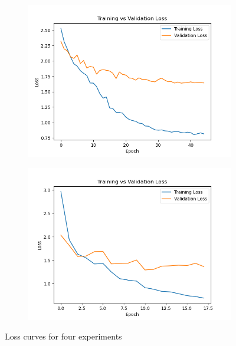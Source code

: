 \documentclass{article}
\begin{document}
\begin{figure}[H]
      \begin{subfigure}[b]{0.45\textwidth}
        \centering
        \includegraphics[width=\textwidth]{figs/loss_curve_3.png}
        \caption{}
        \label{fig:loss_curve_3}
      \end{subfigure}
      \hfill
      \begin{subfigure}[b]{0.45\textwidth}
        \centering
        \includegraphics[width=\textwidth]{figs/loss_curve_4.png}
        \caption{}
        \label{fig:loss_curve_4}
      \end{subfigure}
    
      \caption{Loss curves for four experiments}
      \label{fig:loss_curve}
    \end{figure}
\end{document}
